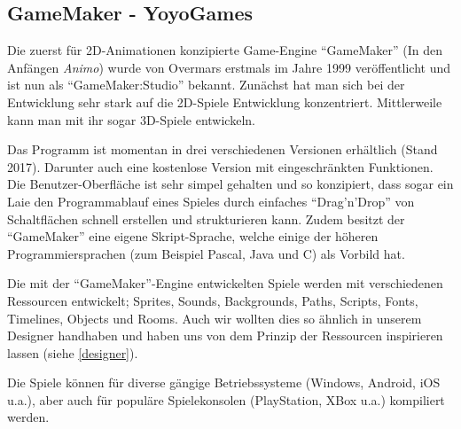 \subsection{GameMaker - YoyoGames}

Die zuerst für 2D-Animationen konzipierte Game-Engine "`GameMaker"' (In den Anfängen \textit{Animo}) wurde von Overmars erstmals im Jahre 1999 veröffentlicht und ist nun als "`GameMaker:Studio"' bekannt. Zunächst hat man sich bei der Entwicklung sehr stark auf die 2D-Spiele Entwicklung konzentriert. Mittlerweile kann man mit ihr sogar 3D-Spiele entwickeln. 

Das Programm ist momentan in drei verschiedenen Versionen erhältlich (Stand 2017). Darunter auch eine kostenlose Version mit eingeschränkten Funktionen.
Die Benutzer-Oberfläche ist sehr simpel gehalten und so konzipiert, dass sogar ein Laie den Programmablauf eines Spieles durch einfaches "`Drag'n'Drop"' von Schaltflächen schnell erstellen und strukturieren kann. Zudem besitzt der "`GameMaker"' eine eigene Skript-Sprache, welche einige der höheren Programmiersprachen (zum Beispiel Pascal, Java und C)  als Vorbild hat.

Die mit der "`GameMaker"'-Engine entwickelten Spiele werden mit verschiedenen Ressourcen entwickelt;
Sprites, Sounds, Backgrounds, Paths, Scripts, Fonts, Timelines, Objects und Rooms. 
Auch wir wollten dies so ähnlich in unserem Designer handhaben und haben uns von dem Prinzip der Ressourcen inspirieren lassen (siehe \cref{designer}).

Die Spiele können für diverse gängige Betriebssysteme (Windows, Android, iOS u.a.), aber auch für populäre Spielekonsolen (PlayStation, XBox u.a.) kompiliert werden. 
